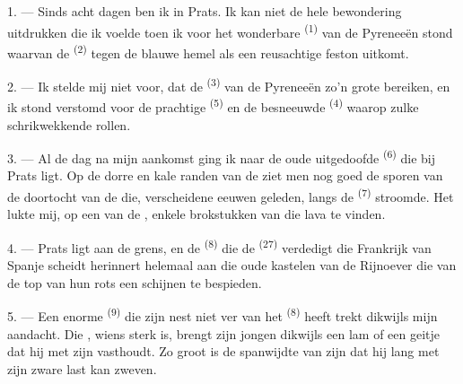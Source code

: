 
\VUsaut{4.0mm}
\VUsaut{3.0mm}

\VUsaut{3.0mm}

\VUsaut{3.0mm}

1. --- Sinds acht dagen ben ik in Prats. Ik kan niet de hele bewondering uitdrukken die ik
voelde toen ik voor het wonderbare  \textsuperscript{(1)} van de Pyreneeën
stond waarvan de  \textsuperscript{(2)} tegen de blauwe hemel als een reusachtige
feston uitkomt.

2. --- Ik stelde mij niet voor, dat de  \textsuperscript{(3)} van de Pyreneeën
zo'n grote  bereiken, en ik stond verstomd voor de prachtige 
\textsuperscript{(5)} en de besneeuwde
 \textsuperscript{(4)} waarop zulke schrikwekkende
 rollen.

\VUsaut{3.0mm}
\VUsaut{3.0mm}

3. --- Al de dag na mijn aankomst ging ik naar de oude uitgedoofde
 \textsuperscript{(6)} die bij Prats ligt. Op de dorre en kale
randen van de  ziet men nog goed de sporen van de doortocht van de
 die, verscheidene eeuwen geleden, langs de 
\textsuperscript{(7)} stroomde. Het lukte mij, op een van de , enkele
brokstukken van die lava te vinden.

4. --- Prats ligt aan de grens, en de  \textsuperscript{(8)} die de
 \textsuperscript{(27)} verdedigt die Frankrijk van Spanje scheidt herinnert
helemaal aan die oude kastelen van de Rijnoever die van de top van hun rots een 
schijnen te bespieden.

5. --- Een enorme  \textsuperscript{(9)} die zijn nest niet ver van het
 \textsuperscript{(8)} heeft trekt dikwijls mijn aandacht. Die
, wiens  sterk is, brengt zijn jongen dikwijls een lam of een
geitje dat hij met zijn  vasthoudt. Zo groot is de spanwijdte van zijn
 dat hij lang met zijn zware last kan zweven.

